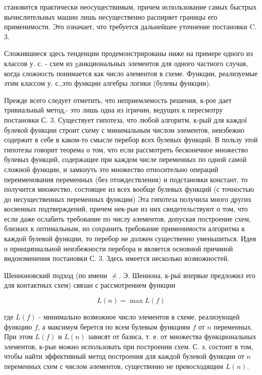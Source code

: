 \documentclass[10pt]{article}
\begin{document}
становится практически неосуществимым, причем использование самых быстрых вычислительных машин лишь несущественно распиряет границы его применимости. Это означает, что требуется дальнейшее уточнение постановки C. 3.



Сложившиеся здесь тенденции продемонстрированы ниже на примере одного из классов у. с. - схем из gанкциональных элементов для одного частного случая, когда сложность понимается как число әлементов в схеме. Функции, реализуемые этим классом у. с.,это функции алгебры логики (булевы функции).



Прежде всего следует отметить, что неприемлемость решения, к-рое дает тривиальный метод,- это лишь одна из ігричин, ведущих к пересмотру постановки С. 3. Существует гипотеза, что любой алгоритм, к-рый для каждої булевой функции строит схему с минимальным числом элементов, неизбежно содержит в себе в каком-то смысле перебор всех булевых функций. В пользу этой гипотезы говорит теорема о том, что если рассмотреть бесконечное множество булевых функций, содержащее при каждом числе переменных по одной самой сложной функции, и замкнуть это множество относительно операций переименования переменных (без отождествления) и подстановки констант, то получится множество, состоящее из всех вообще булевых функций (с точностью до несущественных переменных функции) Эта гипотеза получила много других косвенных подтверждений, причем нек-рые из них свидетельствуют о том, что если даже ослабить требование по числу әлементов, допуская построение схем, близких к оптимальным, но сохранить требование применимости алгоритма к каждой булевой функции, то перебор не должен существенно уменьшиться. Идея о принципиальной неизбежности перебора и является основной причиной видоизменения постановки С. 3. Здесь имеется несколько возможностей.



Шенноновский подход (по имени $\nprec$. Э. Шеннона, к-рыї впервые предложил его для контактных схем) связан с рассмотрением функции



\[

L(n)=\max L(f)

\]



где $L(f)$ - минимально возможное число элементов в схеме, реализующей функцию $f$, а максимум берется по всем булевым функциям $f$ от $n$ переменных. При этом $L(f)$ и $L(n)$ зависят от базиса, т. е. от множества функциональных элементов, к-рые можно использовать при построении схем. С. з. состоит в том, чтобы найти эффективный метод построения для каждой булевой функции от $n$ переменных схем с числом әлементов, существенно не превосходящим $L(n)$.
\end{document}
